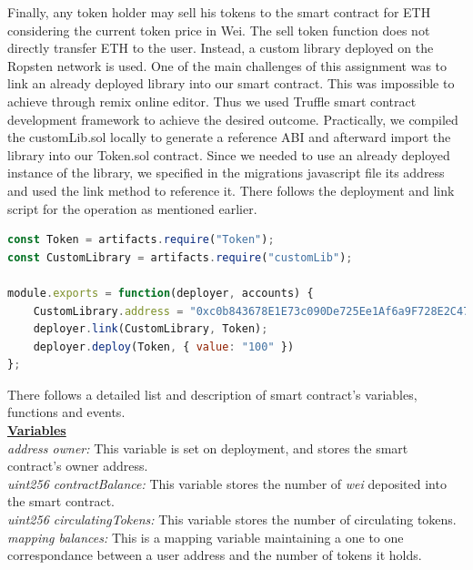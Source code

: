 \documentclass[12pt,a4paper]{article}
\begin{document}
Finally, any token holder may sell his tokens to the smart contract for ETH
considering the current token price in Wei. The sell token function does not
directly transfer ETH to the user. Instead, a custom library deployed on the
Ropsten network is used. One of the main challenges of this assignment was to
link an already deployed library into our smart contract. This was impossible to
achieve through remix online editor. Thus we used Truffle smart contract
development framework to achieve the desired outcome. Practically, we compiled
the customLib.sol locally to generate a reference ABI and afterward import the
library into our Token.sol contract. Since we needed to use an already deployed
instance of the library, we specified in the migrations javascript file its
address and used the link method to reference it. There follows the deployment
and link script for the operation as mentioned earlier. \\

\begin{lstlisting}[language=JavaScript]
const Token = artifacts.require("Token");
const CustomLibrary = artifacts.require("customLib");

module.exports = function(deployer, accounts) {
    CustomLibrary.address = "0xc0b843678E1E73c090De725Ee1Af6a9F728E2C47"
    deployer.link(CustomLibrary, Token);
    deployer.deploy(Token, { value: "100" })
};
\end{lstlisting}

There follows a detailed list and description of smart contract's variables,
functions and events. \\

\textbf{\underline{Variables}} \\

\emph{address owner:} This variable is set on deployment, and stores the smart
contract's owner address.\\

\emph{uint256 contractBalance:} This variable stores the number of \emph{wei} deposited
into the smart contract.\\

\emph{uint256 circulatingTokens:}  This variable stores the number of
circulating tokens.\\

\emph{mapping balances:} This is a mapping variable maintaining a one to one
correspondance between a user address and the number of tokens it holds. \\
\end{document}

